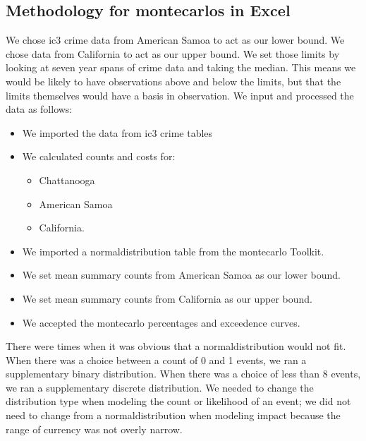 \subsection{Methodology for \Gls{montecarlo}s in Excel}
We chose \gls{ic3} crime data from  American Samoa to act as our lower bound.  We chose data from California to act as our upper bound.  We set those limits by looking at seven year spans of crime data and taking the \gls{median}.  This means we would be likely to have observations above and below the limits, but that the limits themselves would have a basis in observation.
We input and processed the data as follows:
\begin{itemize}
\item We imported the data from \gls{ic3} crime tables
\item We calculated counts and costs for:
  \begin{itemize}
    \item {} Chattanooga
    \item {} American Samoa
    \item {} California.
  \end{itemize}
\item We imported a \gls{normaldistribution} table from the \gls{montecarlo} Toolkit.
\item We set \gls{mean} summary counts from American Samoa as our lower bound.
\item We set \gls{mean} summary counts from California as our upper bound.
\item We accepted the \gls{montecarlo} percentages and exceedence curves.
\end{itemize}

There were times when it was obvious that a \gls{normaldistribution} would not fit.  When there was a choice between a count of 0 and 1 events, we ran a supplementary \gls{binary} \gls{distribution}.  When there was a choice of less than 8 events, we ran a supplementary discrete \gls{distribution}.  We needed to change the \gls{distribution} type when modeling the count or likelihood of an event; we did not need to change from a \gls{normaldistribution} when modeling impact because the range of currency was not overly narrow.

